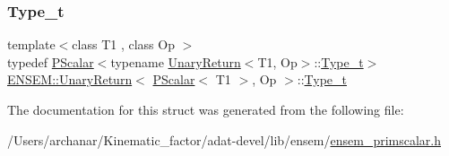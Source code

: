 \subsubsection{\texorpdfstring{Type\_t}{Type\_t}\hspace{0.1cm}{\footnotesize\ttfamily [3/3]}}
{\footnotesize\ttfamily template$<$class T1 , class Op $>$ \\
typedef \mbox{\hyperlink{classENSEM_1_1PScalar}{P\+Scalar}}$<$typename \mbox{\hyperlink{structENSEM_1_1UnaryReturn}{Unary\+Return}}$<$T1, Op$>$\+::\mbox{\hyperlink{structENSEM_1_1UnaryReturn_3_01PScalar_3_01T1_01_4_00_01Op_01_4_a75130a6bdc9f60586c1614ed4177aa96}{Type\+\_\+t}}$>$ \mbox{\hyperlink{structENSEM_1_1UnaryReturn}{E\+N\+S\+E\+M\+::\+Unary\+Return}}$<$ \mbox{\hyperlink{classENSEM_1_1PScalar}{P\+Scalar}}$<$ T1 $>$, Op $>$\+::\mbox{\hyperlink{structENSEM_1_1UnaryReturn_3_01PScalar_3_01T1_01_4_00_01Op_01_4_a75130a6bdc9f60586c1614ed4177aa96}{Type\+\_\+t}}}



The documentation for this struct was generated from the following file\+:\begin{DoxyCompactItemize}
\item 
/\+Users/archanar/\+Kinematic\+\_\+factor/adat-\/devel/lib/ensem/\mbox{\hyperlink{adat-devel_2lib_2ensem_2ensem__primscalar_8h}{ensem\+\_\+primscalar.\+h}}\end{DoxyCompactItemize}
